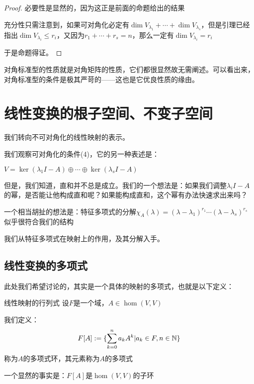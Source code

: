 \documentclass[12pt, a4paper, oneside, UTF8]{ctexbook}
\begin{document}
			\begin{proof}
				必要性是显然的，因为这正是前面的命题给出的结果

				充分性只需注意到，如果可对角化必定有$\dim V_{\lambda_1}+\cdots+\dim V_{\lambda_s}$，但是引理已经指出$\dim V_{\lambda_i}\leqslant r_i$，又因为$r_1+\cdots+r_s=n$，那么一定有$\dim V_{\lambda_i}=r_i$

				于是命题得证。
			\end{proof}
		对角标准型的性质就是对角矩阵的性质，它们都很显然故无需阐述。可以看出来，对角标准型的条件是极其严苛的——这也是它优良性质的缘由。
	\section{线性变换的根子空间、不变子空间}
		我们转向不可对角化的线性映射的表示。

		我们观察可对角化的条件(4)，它的另一种表述是：

		$V=\ker(\lambda_1 I-A)\oplus \cdots \oplus \ker(\lambda_s I-A)$

		但是，我们知道，直和并不总是成立。我们的一个想法是：如果我们调整$\lambda_i I-A$的幂，是否能让他构成直和呢？如果能构成直和，这个幂有办法快速求出来吗？

		一个相当胡扯的想法是：特征多项式的分解$\chi_A(\lambda )=(\lambda -\lambda_1)^{r_1} \cdots (\lambda -\lambda_s)^{r_s}$似乎很符合我们的结构

		我们从特征多项式在映射上的作用，及其分解入手。
		\subsection{线性变换的多项式}
			此处我们希望讨论的，其实是一个具体的映射的多项式，也就是以下定义：
			\begin{defn}{线性映射的行列式}{}
				设$F$是一个域，$A \in \hom(V,V)$

				我们定义：
				\begin{equation}
					F[A]:=\{\sum\limits_{k=0}^{n}a_k A^k| a_k \in F,n \in \mathbb{N}\}
				\end{equation}
				称为$A$的多项式环，其元素称为$A$的多项式
			\end{defn}
			一个显然的事实是：$F[A]$是$\hom(V,V)$的子环
\end{document}
